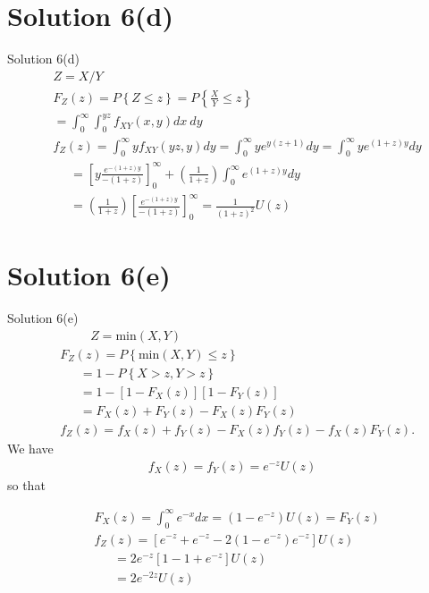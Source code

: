 \documentclass{beamer}
\providecommand{\sbrak}[1]{\ensuremath{{}\left[#1\right]}}
\providecommand{\brak}[1]{\ensuremath{\left(#1\right)}}
\providecommand{\cbrak}[1]{\ensuremath{\left\{#1\right\}}}
\theoremstyle{remark}
\numberwithin{equation}{section}
\numberwithin{figure}{section}
\numberwithin{table}{section}
\begin{document}
\section{Solution 6(d)}
\begin{frame}{Solution 6(d)}
  \begin{align}
    &Z = X/Y \\
    &F_Z\brak{z} = P\cbrak{Z \leq z} = P\cbrak{\frac{X}{Y} \leq z}\\
    &= \int_0^\infty \int_0^{yz} f_{XY}\brak{x,y}dx~dy\\
    &f_Z\brak{z} = \int_0^\infty yf_{XY} \brak{yz,y} dy = \int_0^\infty ye^{y\brak{z+1}}dy = \int_0^\infty ye^{\brak{1+z}y}dy\\
    &~~~~~~=\sbrak{y\frac{e^{-\brak{1+z}y}}{-\brak{1+z}}}_0^\infty + \brak{\frac{1}{1+z}}\int_0^\infty e^{\brak{1+z}y}dy\\
    &~~~~~~=\brak{\frac{1}{1+z}}\sbrak{\frac{e^{-\brak{1+z}y}}{-\brak{1+z}}}_0^\infty = \frac{1}{{\brak{1+z}}^2}U\brak{z}
  \end{align}
\end{frame}
\section{Solution 6(e)}
\begin{frame}{Solution 6(e)}
  \begin{align}
    &~~~~~~~~~~~Z = \text{min} \brak{X,Y}\\
    &F_Z\brak{z} = P\cbrak{\text{min}\brak{X,Y}\leq z}\\
    &~~~~~~~=1-P\cbrak{X > z, Y > z}\\
    &~~~~~~~=1-\sbrak{1-F_X\brak{z}}\sbrak{1-F_Y\brak{z}}\\
    &~~~~~~~=F_X\brak{z} + F_Y\brak{z} -F_X\brak{z}F_Y\brak{z}\\
    &f_Z\brak{z} = f_X\brak{z} + f_Y\brak{z} - F_X\brak{z}f_Y\brak{z} - f_X\brak{z}F_Y\brak{z}.
  \end{align}
  We have
  \begin{align}
    f_X\brak{z} = f_Y\brak{z} = e^{-z}U\brak{z}
  \end{align}
  so that
\end{frame}
\begin{frame}
  \begin{align}
    &F_X\brak{z} = \int_0^\infty e^{-x}dx = \brak{1-e^{-z}}U\brak{z} = F_Y\brak{z}\\
    &f_Z\brak{z} = \sbrak{e^{-z} +e^{-z}-2\brak{1-e^{-z}}e^{-z}}U\brak{z}\\
    &~~~~~~~= 2e^{-z}\sbrak{1-1+e^{-z}}U\brak{z}\\
    &~~~~~~~= 2e^{-2z}U\brak{z}
  \end{align}
\end{frame}
\end{document}
